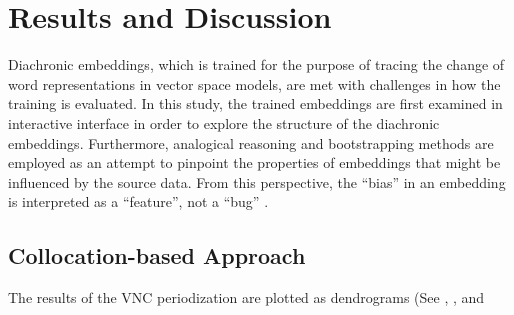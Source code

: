 

\chapter{Results and Discussion}
\label{results}

Diachronic embeddings, which is trained for the purpose of tracing the change of word representations in vector space models, are met with challenges in how the training is evaluated. In this study, the trained embeddings are first examined in interactive interface in order to explore the structure of the diachronic embeddings. Furthermore, analogical reasoning and bootstrapping methods are employed as an attempt to pinpoint the properties of embeddings that might be influenced by the source data. From this perspective, the ``bias'' in an embedding is interpreted as a ``feature'', not a ``bug'' \parencite{wevers2020digital}.

\section{Collocation-based Approach}
The results of the VNC periodization are plotted as dendrograms (See , , and %

